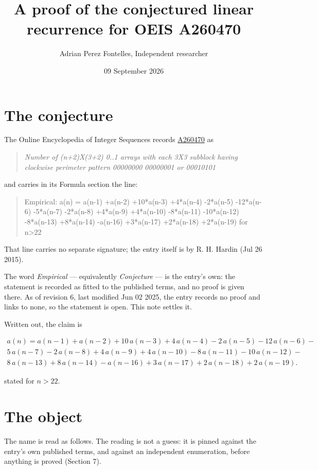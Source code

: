 \documentclass[11pt]{article}
\title{A proof of the conjectured linear recurrence for OEIS A260470}
\author{Adrian Perez Fontelles, Independent researcher}
\date{09 September 2026}
\theoremstyle{definition}
\begin{document}
\maketitle
\section{The conjecture}

The Online Encyclopedia of Integer Sequences records \href{https://oeis.org/A260470}{A260470} as

\begin{quote}\itshape Number of (n+2)X(3+2) 0..1 arrays with each 3X3 subblock having clockwise perimeter pattern 00000000 00000001 or 00010101\end{quote}

and carries in its Formula section the line:

\begin{quote}\ttfamily Empirical: a(n) = a(n-1) +a(n-2) +10*a(n-3) +4*a(n-4) -2*a(n-5) -12*a(n-6) -5*a(n-7) -2*a(n-8) +4*a(n-9) +4*a(n-10) -8*a(n-11) -10*a(n-12) -8*a(n-13) +8*a(n-14) -a(n-16) +3*a(n-17) +2*a(n-18) +2*a(n-19) for n>22\end{quote}

That line carries no separate signature; the entry itself is by R. H. Hardin (Jul 26 2015).

The word {\itshape Empirical} --- equivalently {\itshape Conjecture} --- is the entry's own: the statement is recorded as fitted to the published terms, and no proof is given there. As of revision 6, last modified Jun 02 2025, the entry records no proof and links to none, so the statement is open. This note settles it.

Written out, the claim is

\begin{multline*} a(n) = a(n-1) + a(n-2) + 10\,a(n-3) + 4\,a(n-4) - 2\,a(n-5) - 12\,a(n-6) - \\ 5\,a(n-7) - 2\,a(n-8) + 4\,a(n-9) + 4\,a(n-10) - 8\,a(n-11) - 10\,a(n-12) - \\ 8\,a(n-13) + 8\,a(n-14) - a(n-16) + 3\,a(n-17) + 2\,a(n-18) + 2\,a(n-19). \end{multline*}

stated for $n > 22$.

\section{The object}

The name is read as follows. The reading is not a guess: it is pinned against the entry's own published terms, and against an independent enumeration, before anything is proved (Section 7).
\end{document}
